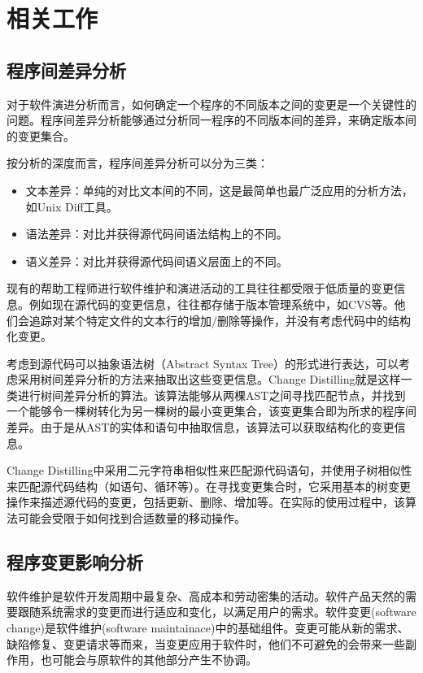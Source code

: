 \chapter{相关工作}
\section{程序间差异分析}

对于软件演进分析而言，如何确定一个程序的不同版本之间的变更是一个关键性的问题。程序间差异分析能够通过分析同一程序的不同版本间的差异，来确定版本间的变更集合。

按分析的深度而言，程序间差异分析可以分为三类：
\begin{itemize}
	\item 文本差异：单纯的对比文本间的不同，这是最简单也最广泛应用的分析方法，如Unix Diff工具。
	\item 语法差异：对比并获得源代码间语法结构上的不同。
	\item 语义差异：对比并获得源代码间语义层面上的不同。
\end{itemize}

现有的帮助工程师进行软件维护和演进活动的工具往往都受限于低质量的变更信息。例如现在源代码的变更信息，往往都存储于版本管理系统中，如CVS等。他们会追踪对某个特定文件的文本行的增加/删除等操作，并没有考虑代码中的结构化变更。

考虑到源代码可以抽象语法树（Abstract Syntax Tree）的形式进行表达，可以考虑采用树间差异分析的方法来抽取出这些变更信息。Change Distilling就是这样一类进行树间差异分析的算法。该算法能够从两棵AST之间寻找匹配节点，并找到一个能够令一棵树转化为另一棵树的最小变更集合，该变更集合即为所求的程序间差异。由于是从AST的实体和语句中抽取信息，该算法可以获取结构化的变更信息。

Change Distilling中采用二元字符串相似性来匹配源代码语句，并使用子树相似性来匹配源代码结构（如语句、循环等）。在寻找变更集合时，它采用基本的树变更操作来描述源代码的变更，包括更新、删除、增加等。在实际的使用过程中，该算法可能会受限于如何找到合适数量的移动操作。

\section{程序变更影响分析}
软件维护是软件开发周期中最复杂、高成本和劳动密集的活动。软件产品天然的需要跟随系统需求的变更而进行适应和变化，以满足用户的需求。软件变更(software change)是软件维护(software maintainace)中的基础组件。变更可能从新的需求、缺陷修复、变更请求等而来，当变更应用于软件时，他们不可避免的会带来一些副作用，也可能会与原软件的其他部分产生不协调。

